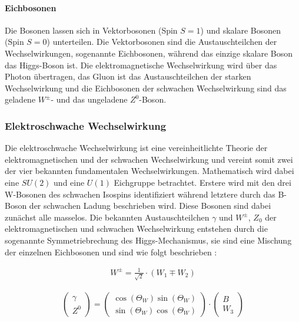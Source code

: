 \paragraph{Eichbosonen}
Die Bosonen lassen sich in Vektorbosonen (Spin $S=1$) und skalare Bosonen (Spin $S=0$) unterteilen. Die Vektorbosonen sind die Austauschteilchen der Wechselwirkungen, sogenannte Eichbosonen, während das einzige skalare Boson das Higgs-Boson ist. Die elektromagnetische Wechselwirkung wird über das Photon übertragen, das Gluon ist das Austauschteilchen der starken Wechselwirkung und die Eichbosonen der schwachen Wechselwirkung sind das geladene $W^\pm$- und das ungeladene $Z^0$-Boson.

\subsubsection{Elektroschwache Wechselwirkung}

Die elektroschwache Wechselwirkung ist eine vereinheitlichte Theorie der elektromagnetischen und der schwachen Wechselwirkung und vereint somit zwei der vier bekannten fundamentalen Wechselwirkungen. Mathematisch wird dabei eine $SU(2)$ und eine $U(1)$ Eichgruppe betrachtet. Erstere wird mit den drei W-Bosonen des schwachen Isospins identifiziert während letztere durch das B-Boson der schwachen Ladung beschrieben wird. Diese Bosonen sind dabei zunächst alle masselos. Die bekannten Austauschteilchen $\gamma$ und $W^{\pm}$, $Z_0$ der elektromagnetischen und schwachen Wechselwirkung entstehen durch die sogenannte Symmetriebrechung des Higgs-Mechanismus, sie sind eine Mischung der einzelnen Eichbosonen und sind wie folgt beschrieben \cite{jakobs}:

\begin{align}
W^{\pm}=\frac{1}{\sqrt{2}}\cdot(W_1 \mp W_2)
\end{align}

\begin{align}
\begin{pmatrix}\gamma\\Z^{0}\end{pmatrix}=\begin{pmatrix}\cos(\Theta_W) \sin(\Theta_W)\\\sin(\Theta_W) \cos(\Theta_W)\end{pmatrix} \cdot \begin{pmatrix}B\\W_3\end{pmatrix}
\end{align}

